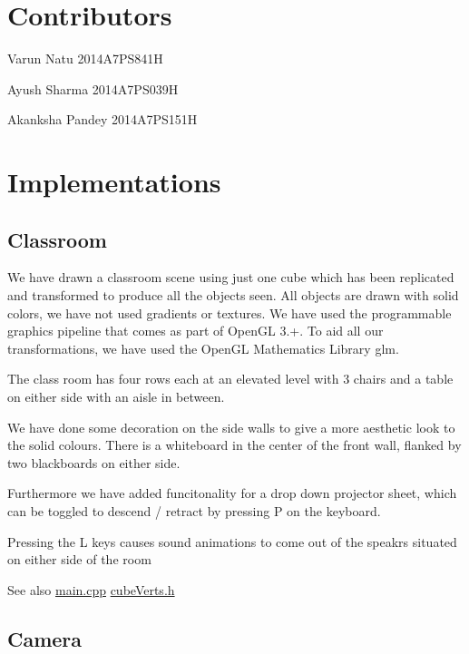 \hypertarget{index_Contributors}{}\section{Contributors}\label{index_Contributors}

\begin{DoxyItemize}
\item Varun Natu 2014\+A7\+P\+S841H
\item Ayush Sharma 2014\+A7\+P\+S039H
\item Akanksha Pandey 2014\+A7\+P\+S151H 
\end{DoxyItemize}\hypertarget{index_Implementations}{}\section{Implementations}\label{index_Implementations}
\hypertarget{index_a1}{}\subsection{Classroom}\label{index_a1}
We have drawn a classroom scene using just one cube which has been replicated and transformed to produce all the objects seen. All objects are drawn with solid colors, we have not used gradients or textures. We have used the programmable graphics pipeline that comes as part of Open\+GL 3.+. To aid all our transformations, we have used the Open\+GL Mathematics Library glm.
\begin{DoxyItemize}
\item The class room has four rows each at an elevated level with 3 chairs and a table on either side with an aisle in between.
\item We have done some decoration on the side walls to give a more aesthetic look to the solid colours. There is a whiteboard in the center of the front wall, flanked by two blackboards on either side.
\item Furthermore we have added funcitonality for a drop down projector sheet, which can be toggled to descend / retract by pressing P on the keyboard.
\item Pressing the L keys causes sound animations to come out of the speakrs situated on either side of the room \begin{DoxySeeAlso}{See also}
\hyperlink{main_8cpp}{main.\+cpp} \hyperlink{cube_verts_8h}{cube\+Verts.\+h}
\end{DoxySeeAlso}

\end{DoxyItemize}\hypertarget{index_a2}{}\subsection{Camera}\label{index_a2}
